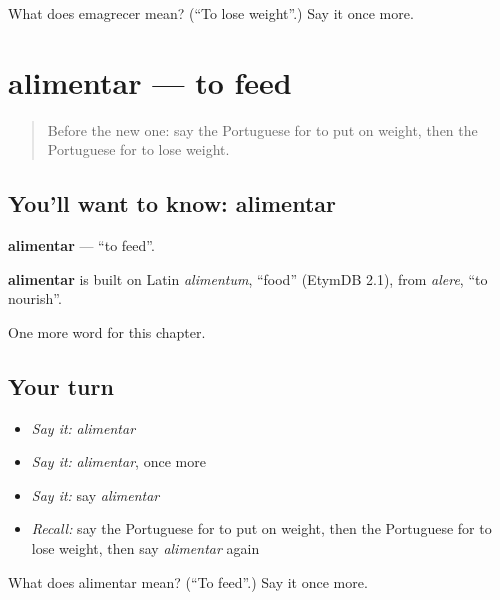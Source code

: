 \begin{tcolorbox}[breakable,colback=teal!4,colframe=teal!35!black,title={Before you move on}]
What does emagrecer mean? (\textquotedblleft{}To lose weight\textquotedblright{}.) Say it once more.
\end{tcolorbox}
\section[alimentar]{alimentar — to feed}

\label{lesson:PT-C239-alimentar}



\begin{quote}
Before the new one: say the Portuguese for to put on weight, then the Portuguese for to lose weight.
\end{quote}

\subsection*{You'll want to know: alimentar}
\textbf{alimentar} — \textquotedblleft{}to feed\textquotedblright{}.

\begin{cousinweb}
\textbf{alimentar} is built on Latin \emph{alimentum}, \textquotedblleft{}food\textquotedblright{} (EtymDB 2.1), from \emph{alere}, \textquotedblleft{}to nourish\textquotedblright{}.
\end{cousinweb}

\begin{grammarlens}[title={What you've built}]
One more word for this chapter.
\end{grammarlens}

\subsection*{Your turn}
\begin{itemize}
\raggedright
  \item \emph{Say it:} \emph{alimentar}
  \item \emph{Say it:} \emph{alimentar}, once more
  \item \emph{Say it:} say \emph{alimentar}
  \item \emph{Recall:} say the Portuguese for to put on weight, then the Portuguese for to lose weight, then say \emph{alimentar} again
\end{itemize}

\begin{tcolorbox}[breakable,colback=teal!4,colframe=teal!35!black,title={Before you move on}]
What does alimentar mean? (\textquotedblleft{}To feed\textquotedblright{}.) Say it once more.
\end{tcolorbox}
